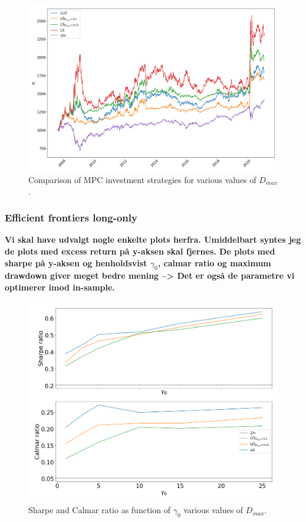 \begin{figure}[H]
    \centering
    \includegraphics[width=1\textwidth]{analysis/portfolio_exercise/images/mle/port_vals_ls.png}
    \caption[Comparison of MPC investment strategies for various values of $D_{max}$]{Comparison of MPC investment strategies for various values of $D_{max}$.}
    \label{fig:MPC_port_vals_ls}
\end{figure}

\subsubsection*{Efficient frontiers long-only}

\textbf{Vi skal have udvalgt nogle enkelte plots herfra. Umiddelbart syntes jeg de plots med excess return på y-aksen skal fjernes. De plots med sharpe på y-aksen og henholdsvist $\gamma_0$, calmar ratio og maximum drawdown giver meget bedre mening --> Det er også de parametre vi optimerer imod in-sample.}

\begin{figure}[H]
    \centering
    \includegraphics[width=1\textwidth]{analysis/portfolio_exercise/images/mle/sharpe_frontier_lo.png}
    \caption[Sharpe and Calmar ratio as function of $\gamma_0$ various values of $D_{max}$]{Sharpe and Calmar ratio as function of $\gamma_0$ various values of $D_{max}$.}
    \label{fig:MPC_sharpe_frontier_lo}
\end{figure}

